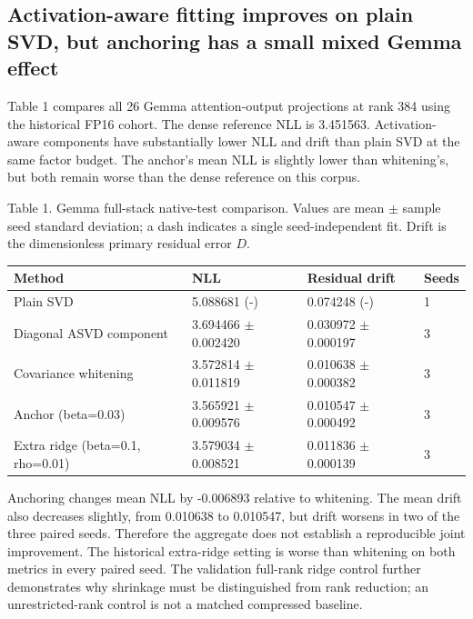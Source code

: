\documentclass[conference]{IEEEtran}
\begin{document}
\subsection{Activation-aware fitting improves on plain SVD, but anchoring has a small mixed Gemma effect}
Table 1 compares all 26 Gemma attention-output projections at rank 384 using the historical FP16 cohort. The dense reference NLL is 3.451563. Activation-aware components have substantially lower NLL and drift than plain SVD at the same factor budget. The anchor's mean NLL is slightly lower than whitening's, but both remain worse than the dense reference on this corpus.\par\smallskip
Table 1. Gemma full-stack native-test comparison. Values are mean \(\pm\) sample seed standard deviation; a dash indicates a single seed-independent fit. Drift is the dimensionless primary residual error $D$.\par\smallskip
{\scriptsize\setlength{\tabcolsep}{2pt}
\noindent\begin{tabular}{@{}p{}p{}p{}p{}@{}}\toprule
Method & NLL & Residual drift & Seeds \\
\midrule
Plain SVD & 5.088681 (-) & 0.074248 (-) & 1 \\
Diagonal ASVD component & 3.694466 \(\pm\) 0.002420 & 0.030972 \(\pm\) 0.000197 & 3 \\
Covariance whitening & 3.572814 \(\pm\) 0.011819 & 0.010638 \(\pm\) 0.000382 & 3 \\
Anchor (beta=0.03) & 3.565921 \(\pm\) 0.009576 & 0.010547 \(\pm\) 0.000492 & 3 \\
Extra ridge (beta=0.1, rho=0.01) & 3.579034 \(\pm\) 0.008521 & 0.011836 \(\pm\) 0.000139 & 3 \\
\bottomrule\end{tabular}}\par\medskip
Anchoring changes mean NLL by -0.006893 relative to whitening. The mean drift also decreases slightly, from 0.010638 to 0.010547, but drift worsens in two of the three paired seeds. Therefore the aggregate does not establish a reproducible joint improvement. The historical extra-ridge setting is worse than whitening on both metrics in every paired seed. The validation full-rank ridge control further demonstrates why shrinkage must be distinguished from rank reduction; an unrestricted-rank control is not a matched compressed baseline.\par\smallskip
\end{document}
